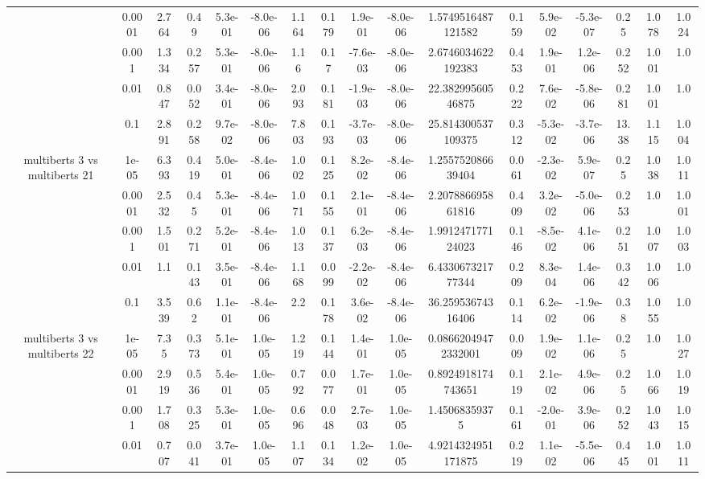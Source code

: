 \begin{tabular}{|c|c|c|c|c|c|c|c|c|c|c|c|c|c|c|c|c|}
 & 0.0001 & 2.764 & 0.49 & 5.3e-01 & -8.0e-06 & 1.164 & 0.179 & 1.9e-01 & -8.0e-06 & 1.5749516487121582 & 0.159 & 5.9e-02 & -5.3e-07 & 0.25 & 1.078 & 1.024 \\
 & 0.001 & 1.334 & 0.257 & 5.3e-01 & -8.0e-06 & 1.16 & 0.17 & -7.6e-03 & -8.0e-06 & 2.6746034622192383 & 0.453 & 1.9e-01 & 1.2e-06 & 0.252 & 1.001 & 1.0 \\
 & 0.01 & 0.847 & 0.052 & 3.4e-01 & -8.0e-06 & 2.093 & 0.181 & -1.9e-03 & -8.0e-06 & 22.38299560546875 & 0.222 & 7.6e-02 & -5.8e-06 & 0.281 & 1.001 & 1.0 \\
 & 0.1 & 2.891 & 0.258 & 9.7e-02 & -8.0e-06 & 7.803 & 0.193 & -3.7e-03 & -8.0e-06 & 25.814300537109375 & 0.312 & -5.3e-02 & -3.7e-06 & 13.38 & 1.115 & 1.004 \\
\hline
\multirow{5}{*}{multiberts 3 vs multiberts 21} & 1e-05 & 6.393 & 0.419 & 5.0e-01 & -8.4e-06 & 1.002 & 0.125 & 8.2e-02 & -8.4e-06 & 1.255752086639404 & 0.061 & -2.3e-02 & 5.9e-07 & 0.25 & 1.038 & 1.011 \\
 & 0.0001 & 2.532 & 0.45 & 5.3e-01 & -8.4e-06 & 1.071 & 0.155 & 2.1e-01 & -8.4e-06 & 2.207886695861816 & 0.409 & 3.2e-02 & -5.0e-06 & 0.253 & 1.0 & 1.001 \\
 & 0.001 & 1.501 & 0.271 & 5.2e-01 & -8.4e-06 & 1.013 & 0.137 & 6.2e-03 & -8.4e-06 & 1.991247177124023 & 0.146 & -8.5e-02 & 4.1e-06 & 0.251 & 1.007 & 1.003 \\
 & 0.01 & 1.1 & 0.143 & 3.5e-01 & -8.4e-06 & 1.168 & 0.099 & -2.2e-02 & -8.4e-06 & 6.433067321777344 & 0.209 & 8.3e-04 & 1.4e-06 & 0.342 & 1.006 & 1.0 \\
 & 0.1 & 3.539 & 0.62 & 1.1e-01 & -8.4e-06 & 2.2 & 0.178 & 3.6e-02 & -8.4e-06 & 36.25953674316406 & 0.114 & 6.2e-02 & -1.9e-06 & 0.38 & 1.055 & 1.0 \\
\hline
\multirow{5}{*}{multiberts 3 vs multiberts 22} & 1e-05 & 7.35 & 0.373 & 5.1e-01 & 1.0e-05 & 1.219 & 0.144 & 1.4e-01 & 1.0e-05 & 0.08662049472332001 & 0.009 & 1.9e-02 & 1.1e-06 & 0.25 & 1.0 & 1.027 \\
 & 0.0001 & 2.919 & 0.536 & 5.4e-01 & 1.0e-05 & 0.792 & 0.077 & 1.7e-01 & 1.0e-05 & 0.8924918174743651 & 0.119 & 2.1e-02 & 4.9e-06 & 0.25 & 1.066 & 1.019 \\
 & 0.001 & 1.708 & 0.325 & 5.3e-01 & 1.0e-05 & 0.696 & 0.048 & 2.7e-03 & 1.0e-05 & 1.45068359375 & 0.161 & -2.0e-01 & 3.9e-06 & 0.252 & 1.043 & 1.015 \\
 & 0.01 & 0.707 & 0.041 & 3.7e-01 & 1.0e-05 & 1.107 & 0.134 & 1.2e-02 & 1.0e-05 & 4.9214324951171875 & 0.219 & 1.1e-02 & -5.5e-06 & 0.445 & 1.001 & 1.011 \\

\end{tabular}
